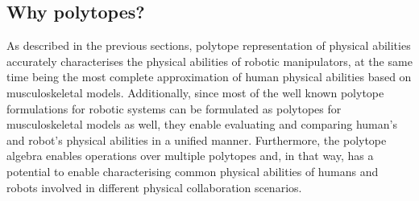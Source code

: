 

\subsection{Why polytopes?}

As described in the previous sections, polytope representation of physical abilities accurately 
characterises the physical abilities of robotic manipulators, at the same time being the most complete approximation of human physical abilities based on musculoskeletal models. Additionally, since most of the well known polytope formulations for robotic systems can be formulated as polytopes for musculoskeletal models as well, they enable evaluating and comparing human's and robot's physical abilities in a unified manner. Furthermore, the polytope algebra enables operations over multiple polytopes and, in that way, has a potential to enable characterising common physical abilities of humans and robots involved in different physical collaboration scenarios. 

